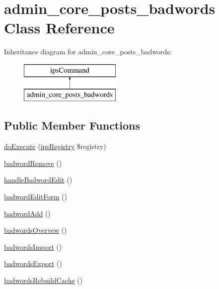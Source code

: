 \hypertarget{classadmin__core__posts__badwords}{\section{admin\-\_\-core\-\_\-posts\-\_\-badwords Class Reference}
\label{classadmin__core__posts__badwords}
}
Inheritance diagram for admin\-\_\-core\-\_\-posts\-\_\-badwords\-:\begin{figure}[H]
\begin{center}
\leavevmode
\includegraphics[height=2.000000cm]{classadmin__core__posts__badwords}
\end{center}
\end{figure}
\subsection*{Public Member Functions}
\begin{DoxyCompactItemize}
\item 
\hyperlink{classadmin__core__posts__badwords_afbc4e912a0604b94d47d66744c64d8ba}{do\-Execute} (\hyperlink{classips_registry}{ips\-Registry} \$registry)
\item 
\hyperlink{classadmin__core__posts__badwords_ae4c86bd4cdc7abf1914ec4dab805dadd}{badword\-Remove} ()
\item 
\hyperlink{classadmin__core__posts__badwords_a17267582299edbd58ceaed4905ad6895}{handle\-Badword\-Edit} ()
\item 
\hyperlink{classadmin__core__posts__badwords_ab935c49725add166382e2119cda4fdf9}{badword\-Edit\-Form} ()
\item 
\hyperlink{classadmin__core__posts__badwords_a1be32fd1052f6a55fe88557fc0a1b94e}{badword\-Add} ()
\item 
\hyperlink{classadmin__core__posts__badwords_ad27a7d45e38dbbbeeec0ff313b00fbc9}{badwords\-Overvew} ()
\item 
\hyperlink{classadmin__core__posts__badwords_a7bdafe89deb5e5fa5b5f42e6838ed27e}{badwords\-Import} ()
\item 
\hyperlink{classadmin__core__posts__badwords_a17a805ccc41946c604cb980aa6d518e6}{badwords\-Export} ()
\item 
\hyperlink{classadmin__core__posts__badwords_acfdd93c174112d5dff82437d811b5b6b}{badwords\-Rebuild\-Cache} ()
\end{DoxyCompactItemize}
